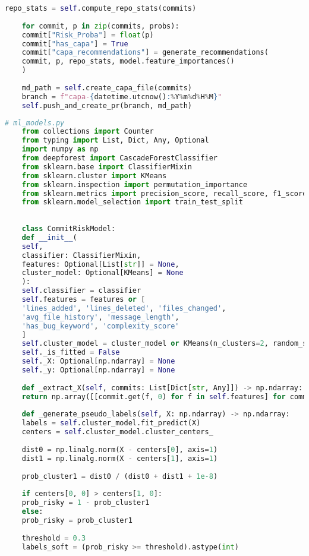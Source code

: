 \begin{lstlisting}[language=Python, caption={{ \texttt{repository\_analysis.py}}}]
	repo_stats = self.compute_repo_stats(commits)
	
	for commit, p in zip(commits, probs):
	commit["Risk_Proba"] = float(p)
	commit["has_capa"] = True
	commit["capa_recommendations"] = generate_recommendations(
	commit, p, repo_stats, model.feature_importances()
	)
	
	md_path = self.create_capa_file(commits)
	branch = f"capa-{datetime.utcnow():%Y%m%d%H%M}"
	self.push_and_create_pr(branch, md_path)
\end{lstlisting}

\begin{lstlisting}[language=Python, caption={{ \texttt{ml\_model.py}}}]
	# ml_models.py
	from collections import Counter
	from typing import List, Dict, Any, Optional
	import numpy as np
	from deepforest import CascadeForestClassifier
	from sklearn.base import ClassifierMixin
	from sklearn.cluster import KMeans
	from sklearn.inspection import permutation_importance
	from sklearn.metrics import precision_score, recall_score, f1_score, roc_auc_score
	from sklearn.model_selection import train_test_split
	
	
	class CommitRiskModel:
	def __init__(
	self,
	classifier: ClassifierMixin,
	features: Optional[List[str]] = None,
	cluster_model: Optional[KMeans] = None
	):
	self.classifier = classifier
	self.features = features or [
	'lines_added', 'lines_deleted', 'files_changed',
	'avg_file_history', 'message_length',
	'has_bug_keyword', 'complexity_score'
	]
	self.cluster_model = cluster_model or KMeans(n_clusters=2, random_state=0, n_init=10)
	self._is_fitted = False
	self._X: Optional[np.ndarray] = None
	self._y: Optional[np.ndarray] = None
	
	def _extract_X(self, commits: List[Dict[str, Any]]) -> np.ndarray:
	return np.array([[commit.get(f, 0) for f in self.features] for commit in commits])
	
	def _generate_pseudo_labels(self, X: np.ndarray) -> np.ndarray:
	labels = self.cluster_model.fit_predict(X)
	centers = self.cluster_model.cluster_centers_
	
	dist0 = np.linalg.norm(X - centers[0], axis=1)
	dist1 = np.linalg.norm(X - centers[1], axis=1)
	
	prob_cluster1 = dist0 / (dist0 + dist1 + 1e-8)
	
	if centers[0, 0] > centers[1, 0]:
	prob_risky = 1 - prob_cluster1
	else:
	prob_risky = prob_cluster1
	
	threshold = 0.3
	labels_soft = (prob_risky >= threshold).astype(int)
	

\end{lstlisting}
